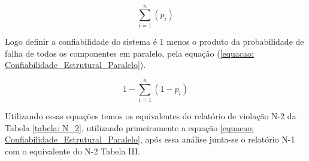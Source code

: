 \documentclass[lettersize,journal]{IEEEtran}
\begin{document}
\begin{equation}
	\sum_{i=1}^{n}(p_{i})
	\label{equacao: Confiabilidade_Estrutural_Serie}
\end{equation}

Logo definir a confiabilidade do sistema é 1 menos o produto da probabilidade de falha de todos os componentes em paralelo, pela equação (\ref{equacao: Confiabilidade_Estrutural_Paralelo}).

\begin{equation}
	1-\sum_{i=1}^{n}(1-p_{i})
	\label{equacao: Confiabilidade_Estrutural_Paralelo}
\end{equation}

Utilizando essas equações temos os equivalentes do relatório de violação N-2 da Tabela \ref{tabela: N_2}, utilizando primeiramente a equação \ref{equacao: Confiabilidade_Estrutural_Paralelo}, após essa análise junta-se o relatório N-1 com o equivalente do N-2 Tabela III.
\end{document}
